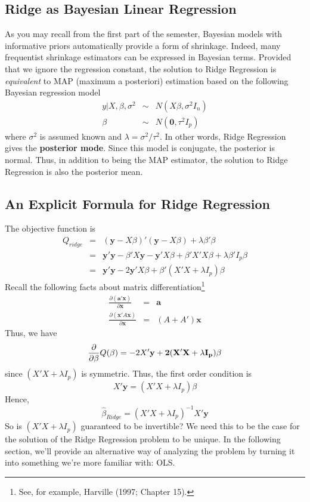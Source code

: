 \subsection{Ridge as Bayesian Linear Regression}
As you may recall from the first part of the semester, Bayesian models with informative priors automatically provide a form of shrinkage. Indeed, many frequentist shrinkage estimators can be expressed in Bayesian terms. Provided that we ignore the regression constant, the solution to Ridge Regression is \emph{equivalent} to MAP (maximum a posteriori) estimation based on the following  Bayesian regression model
	\begin{eqnarray*}
		y|X, \beta, \sigma^2 &\sim& N(X\beta,\sigma^2 I_n) \\
		\beta &\sim& N(\mathbf{0}, \tau^2 I_p)
	\end{eqnarray*}
where $\sigma^2$ is assumed known and $\lambda = \sigma^2/\tau^2$. In other words, Ridge Regression gives the \textbf{posterior mode}. Since this model is conjugate, the posterior is normal. Thus, in addition to being the MAP estimator, the solution to Ridge Regression is also the posterior mean.


\subsection{An Explicit Formula for Ridge Regression}
The objective function is
\begin{eqnarray*}
	Q_{ridge}&=& (\mathbf{y} - X\beta)' (\mathbf{y} - X\beta) + \lambda \beta'\beta\\
	&=&\mathbf{y}'\mathbf{y} - \beta'X \mathbf{y} - \mathbf{y}'X\beta + \beta'X'X \beta + \lambda \beta' I_p \beta\\
	&=& \mathbf{y}'\mathbf{y} - 2 \mathbf{y}'X\beta + \beta'(X'X + \lambda I_p)\beta
\end{eqnarray*}
Recall the following facts about matrix differentiation\footnote{See, for example, Harville (1997; Chapter 15).}
	\begin{eqnarray*}
		\frac{\partial (\mathbf{a}' \mathbf{x})}{\partial \mathbf{x}}  &=& \mathbf{a}\\
		\frac{\partial( \mathbf{x}'A \mathbf{x})}{\partial \mathbf{x}} &=& (A + A')\mathbf{x}
	\end{eqnarray*}
Thus, we have 
$$\frac{\partial}{\partial \beta} Q(\beta) = -2X'\bf{y} + 2(X'X + \lambda I_p)\beta$$
since $(X'X + \lambda I_p)$ is symmetric. Thus, the first order condition is 
	$$X'\textbf{y} = (X'X + \lambda I_p)\beta$$
Hence,
	$$\widehat{\beta}_{Ridge} = (X'X + \lambda I_p)^{-1} X'\textbf{y}$$
So is $(X'X + \lambda I_p)$ guaranteed to be invertible? We need this to be the case for the solution of the Ridge Regression problem to be unique. In the following section, we'll provide an alternative way of analyzing the problem by turning it into something we're more familiar with: OLS.

